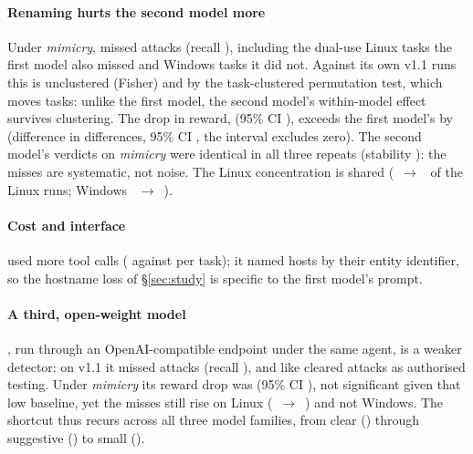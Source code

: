 \paragraph{Renaming hurts the second model more} Under \emph{mimicry}, \McModelB{} missed
\McGptMimicryMissed{} attacks (recall \McGptMimicryRecall{}), including the dual-use Linux tasks the first model
also missed and Windows tasks it did not. Against its own v1.1 runs this is \McGptMimicryMissP{} unclustered
(Fisher) and \McGptMimicryMissClusterP{} by the task-clustered permutation test, which moves
\McGptMimicryMissClusterTasks{} tasks: unlike the first model, the second model's within-model effect survives
clustering. The drop in reward, \McGptMimicryDrop{} (95\% CI \McGptMimicryDropCI{}), exceeds the first model's
\McClaudeMimicryDrop{} by \McDiD{} (difference in differences, 95\% CI \McDiDCI{}, the interval excludes zero).
The second model's verdicts on \emph{mimicry} were identical in all three repeats (stability
\McGptMimicryStable{}): the misses are systematic, not noise. The Linux concentration is shared
(\McGptLinuxBaseMissed{}~$\to$~\McGptLinuxMimicryMissed{} of the Linux runs; Windows
\McGptWindowsBaseMissed{}~$\to$~\McGptWindowsMimicryMissed{}).

\ifconf\else
\paragraph{Cost and interface} \McModelB{} used more tool calls (\McGptBaseCalls{} against \McClaudeBaseCalls{}
per task); it named hosts by their entity identifier, so the hostname loss of \S\ref{sec:study} is specific to
the first model's prompt.
\fi

\paragraph{A third, open-weight model} \McModelC{}, run through an OpenAI-compatible endpoint under the same
agent, is a weaker detector: on v1.1 it missed \McDeepseekVBaseMissed{} attacks (recall \McDeepseekVBaseRecall{}),
and like \McModelB{} cleared attacks as authorised testing. Under \emph{mimicry} its reward drop was
\McDeepseekVMimicryDrop{} (95\% CI \McDeepseekVMimicryDropCI{}), not significant given that low baseline, yet the
misses still rise on Linux (\McDeepseekVLinuxBaseMissed{}~$\to$~\McDeepseekVLinuxMimicryMissed{}) and not Windows.
The shortcut thus recurs across all three model families, from clear (\McModelB{}) through suggestive
(\McModelA{}) to small (\McModelC{}).

